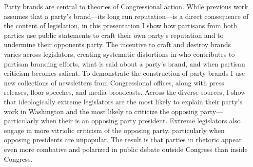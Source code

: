Party brands are central to theories of Congressional action.  While previous work assumes that a party's brand---its long run reputation---is a direct consequence of the content of legislation, in this presentation I show how partisans from both parties use public statements to craft their own party's reputation and to undermine their opponents party.   The incentive to craft and destroy brands varies across legislators, creating systematic distortions in who contributes to partisan branding efforts, what is said about a party's brand, and when partisan criticism becomes salient. To demonstrate the construction of party brands I use new collections of newsletters from Congressional offices, along with press releases, floor speeches, and media broadcasts.  Across the diverse sources, I show that ideologically extreme legislators are the most likely to explain their party's work in Washington and the most likely to criticize the opposing party---particularly when their is an opposing party president.  Extreme legislators also engage in more vitriolic criticism of the opposing party, particularly when opposing presidents are unpopular.  The result is that parties in rhetoric appear even more combative and polarized in public debate outside Congress than inside Congress.

